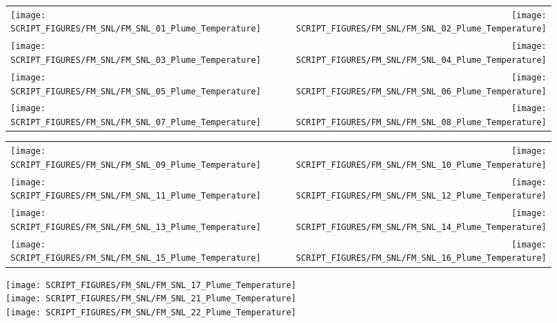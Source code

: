 \begin{figure}[p]
\begin{tabular*}{\textwidth}{l@{\extracolsep{\fill}}r}
\texttt{[image: SCRIPT\_FIGURES/FM\_SNL/FM\_SNL\_01\_Plume\_Temperature]} &
\texttt{[image: SCRIPT\_FIGURES/FM\_SNL/FM\_SNL\_02\_Plume\_Temperature]} \\
\texttt{[image: SCRIPT\_FIGURES/FM\_SNL/FM\_SNL\_03\_Plume\_Temperature]} &
\texttt{[image: SCRIPT\_FIGURES/FM\_SNL/FM\_SNL\_04\_Plume\_Temperature]} \\
\texttt{[image: SCRIPT\_FIGURES/FM\_SNL/FM\_SNL\_05\_Plume\_Temperature]} &
\texttt{[image: SCRIPT\_FIGURES/FM\_SNL/FM\_SNL\_06\_Plume\_Temperature]} \\
\texttt{[image: SCRIPT\_FIGURES/FM\_SNL/FM\_SNL\_07\_Plume\_Temperature]} &
\texttt{[image: SCRIPT\_FIGURES/FM\_SNL/FM\_SNL\_08\_Plume\_Temperature]}
\end{tabular*}
\end{figure}

\begin{figure}[p]
\begin{tabular*}{\textwidth}{l@{\extracolsep{\fill}}r}
\texttt{[image: SCRIPT\_FIGURES/FM\_SNL/FM\_SNL\_09\_Plume\_Temperature]} &
\texttt{[image: SCRIPT\_FIGURES/FM\_SNL/FM\_SNL\_10\_Plume\_Temperature]} \\
\texttt{[image: SCRIPT\_FIGURES/FM\_SNL/FM\_SNL\_11\_Plume\_Temperature]} &
\texttt{[image: SCRIPT\_FIGURES/FM\_SNL/FM\_SNL\_12\_Plume\_Temperature]} \\
\texttt{[image: SCRIPT\_FIGURES/FM\_SNL/FM\_SNL\_13\_Plume\_Temperature]} &
\texttt{[image: SCRIPT\_FIGURES/FM\_SNL/FM\_SNL\_14\_Plume\_Temperature]} \\
\texttt{[image: SCRIPT\_FIGURES/FM\_SNL/FM\_SNL\_15\_Plume\_Temperature]} &
\texttt{[image: SCRIPT\_FIGURES/FM\_SNL/FM\_SNL\_16\_Plume\_Temperature]}
\end{tabular*}
\end{figure}

\begin{figure}[p]
\begin{center}
\texttt{[image: SCRIPT\_FIGURES/FM\_SNL/FM\_SNL\_17\_Plume\_Temperature]} \\
\texttt{[image: SCRIPT\_FIGURES/FM\_SNL/FM\_SNL\_21\_Plume\_Temperature]} \\
\texttt{[image: SCRIPT\_FIGURES/FM\_SNL/FM\_SNL\_22\_Plume\_Temperature]}
\end{center}
\end{figure}

